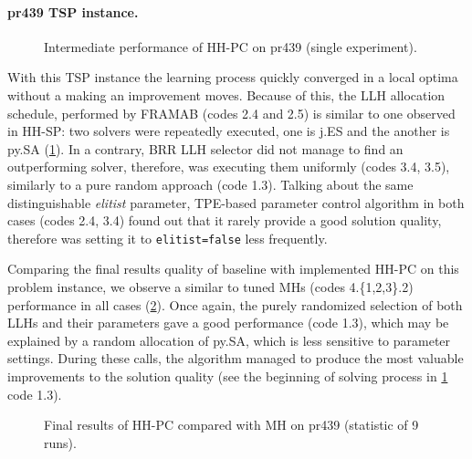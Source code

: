 \newpage
\paragraph{pr439 TSP instance.}
\begin{figure}[t]
	\centering
	\vspace{-20pt}
	
	\caption{Intermediate performance of HH-PC on pr439 (single experiment).}
	\vspace{-10pt}
	\label{eval:pict:hh-pc:pr439 intermediate}
\end{figure}
With this TSP instance the learning process quickly converged in a local optima without a making an improvement moves. Because of this, the LLH allocation schedule, performed by FRAMAB (codes 2.4 and 2.5) is similar to one observed in HH-SP: two solvers were repeatedly executed, one is j.ES and the another is py.SA (\cref{eval:pict:hh-pc:pr439 intermediate}). In a contrary, BRR LLH selector did not manage to find an outperforming solver, therefore, was executing them uniformly (codes 3.4, 3.5), similarly to a pure random approach (code 1.3). Talking about the same distinguishable \emph{elitist} parameter, TPE-based parameter control algorithm in both cases (codes 2.4, 3.4) found out that it rarely provide a good solution quality, therefore was setting it to \texttt{elitist=false} less frequently. 

Comparing the final results quality of baseline with implemented HH-PC on this problem instance, we observe a similar to tuned MHs (codes 4.\{1,2,3\}.2) performance in all cases (\cref{eval:pict:hh-pc:pr439 final}). Once again, the purely randomized selection of both LLHs and their parameters gave a good performance (code 1.3), which may be explained by a random allocation of py.SA, which is less sensitive to parameter settings. During these calls, the algorithm managed to produce the most valuable improvements to the solution quality (see the beginning of solving process in \cref{eval:pict:hh-pc:pr439 intermediate} code 1.3).

\begin{figure}[b]
	\centering
	\vspace{-20pt}
	
	\caption{Final results of HH-PC compared with MH on pr439 (statistic of 9 runs).}
	\vspace{-5pt}
	\label{eval:pict:hh-pc:pr439 final}
\end{figure}

